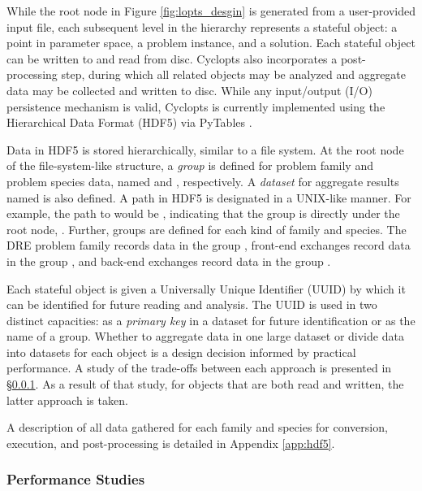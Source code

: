 While the root node in Figure \ref{fig:lopts_desgin} is generated from a
user-provided input file, each subsequent level in the hierarchy represents a
stateful object: a point in parameter space, a problem instance, and a
solution. Each stateful object can be written to and read from disc. Cyclopts
also incorporates a post-processing step, during which all related objects may
be analyzed and aggregate data may be collected and written to disc. While any
input/output (I/O) persistence mechanism is valid, Cyclopts is currently
implemented using the Hierarchical Data Format (HDF5) \cite{hdf5} via PyTables
\cite{pytables}.

Data in HDF5 is stored hierarchically, similar to a file system. At the root node
of the file-system-like structure, a \textit{group} is defined for problem family
and problem species data, named  and ,
respectively. A \textit{dataset} for aggregate results named  is
also defined. A path in HDF5 is designated in a UNIX-like manner. For example,
the path to  would be , indicating that the group is
directly under the root node, \code{/}. Further, groups are defined for each
kind of family and species. The DRE problem family records data in the group
, front-end exchanges record data in the group
, and back-end exchanges record data in the
group . 

Each stateful object is given a Universally Unique Identifier (UUID) by which it
can be identified for future reading and analysis. The UUID is used in two
distinct capacities: as a \textit{primary key} in a dataset for future
identification or as the name of a group. Whether to aggregate data in one large
dataset or divide data into datasets for each object is a design decision
informed by practical performance. A study of the trade-offs between each
approach is presented in \S \ref{method:tools:hdf5:study}. As a result of that
study, for objects that are both read and written, the latter approach is taken.

A description of all data gathered for each family and species for conversion,
execution, and post-processing is detailed in Appendix \ref{app:hdf5}.

\subsubsection{Performance Studies}\label{method:tools:hdf5:study}

